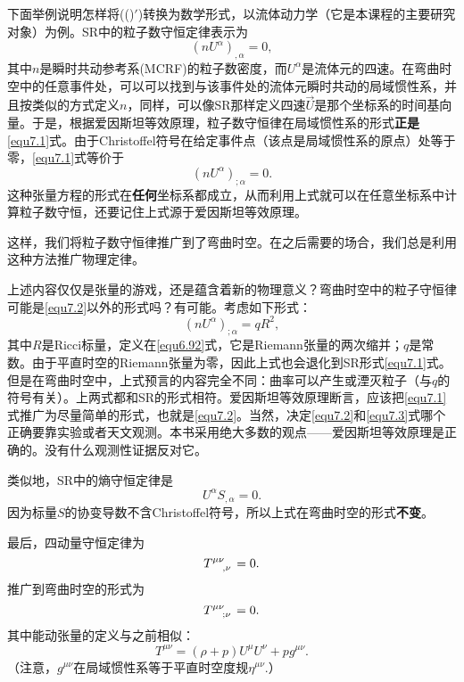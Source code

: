 下面举例说明怎样将((\uppercase\expandafter{})$'$)转换为数学形式，以流体动力学（它是本课程的主要研究对象）为例。SR中的粒子数守恒定律表示为
\begin{equation}
    (n U^\alpha)_{, \alpha} = 0,
\label{equ7.1}
\end{equation}
其中$n$是瞬时共动参考系(MCRF)的粒子数密度，而$U^\alpha$是流体元的四速。在弯曲时空中的任意事件处，可以可以找到与该事件处的流体元瞬时共动的局域惯性系，并且按类似的方式定义$n$，同样，可以像SR那样定义四速$\vec{U}$是那个坐标系的时间基向量。于是，根据爱因斯坦等效原理，粒子数守恒律在局域惯性系的形式\textbf{正是}\eqref{equ7.1}式。由于Christoffel符号在给定事件点（该点是局域惯性系的原点）处等于零，\eqref{equ7.1}式等价于
\begin{equation}
    (n U^\alpha)_{; \alpha} = 0.
\label{equ7.2}
\end{equation}
这种张量方程的形式在\textbf{任何}坐标系都成立，从而利用上式就可以在任意坐标系中计算粒子数守恒，还要记住上式源于爱因斯坦等效原理。

这样，我们将粒子数守恒律推广到了弯曲时空。在之后需要的场合，我们总是利用这种方法推广物理定律。

上述内容仅仅是张量的游戏，还是蕴含着新的物理意义？弯曲时空中的粒子守恒律可能是\eqref{equ7.2}以外的形式吗？有可能。考虑如下形式：
\begin{equation}
    (n U^\alpha)_{; \alpha} = qR^2,
\label{equ7.3}
\end{equation}
其中$R$是Ricci标量，定义在\eqref{equ6.92}式，它是Riemann张量的两次缩并；$q$是常数。由于平直时空的Riemann张量为零，因此上式也会退化到SR形式\eqref{equ7.1}式。但是在弯曲时空中，上式预言的内容完全不同：曲率可以产生或湮灭粒子（与$q$的符号有关）。上两式都和SR的形式相符。爱因斯坦等效原理断言，应该把\eqref{equ7.1}式推广为尽量简单的形式，也就是\eqref{equ7.2}。当然，决定\eqref{equ7.2}和\eqref{equ7.3}式哪个正确要靠实验或者天文观测。本书采用绝大多数的观点——爱因斯坦等效原理是正确的。没有什么观测性证据反对它。

类似地，SR中的熵守恒定律是
\begin{equation}
    U^\alpha S_{, \alpha} = 0.
\label{equ7.4}
\end{equation}
因为标量$S$的协变导数不含Christoffel符号，所以上式在弯曲时空的形式\textbf{不变}。

最后，四动量守恒定律为
\begin{equation}
    T\indices{^{\mu \nu}_{, \nu}} = 0.
\label{equ7.5}
\end{equation}
推广到弯曲时空的形式为
\begin{equation}
    T\indices{^{\mu \nu}_{; \nu}} = 0.
\label{equ7.6}
\end{equation}
其中能动张量的定义与之前相似：
\begin{equation}
    T^{\mu \nu} = (\rho + p) U^\mu U^\nu + p g^{\mu \nu}.
\label{equ7.7}
\end{equation}
（注意，$g^{\mu \nu}$在局域惯性系等于平直时空度规$\eta^{\mu \nu}$.）

